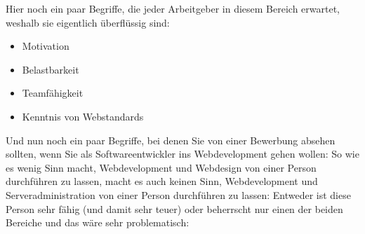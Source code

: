 Hier noch ein paar Begriffe, die jeder Arbeitgeber in diesem Bereich erwartet, weshalb sie eigentlich überflüssig sind:

\begin{itemize}
	\item Motivation
	\item Belastbarkeit
	\item Teamfähigkeit
	\item Kenntnis von Webstandards
\end{itemize}

Und nun noch ein paar Begriffe, bei denen Sie von einer Bewerbung absehen sollten, wenn Sie als Softwareentwickler ins Webdevelopment gehen wollen: So wie es wenig Sinn macht, Webdevelopment und Webdesign von einer Person durchführen zu lassen, macht es auch keinen Sinn, Webdevelopment und Serveradministration von einer Person durchführen zu lassen: Entweder ist diese Person sehr fähig (und damit sehr teuer) oder beherrscht nur einen der beiden Bereiche und das wäre sehr problematisch:

